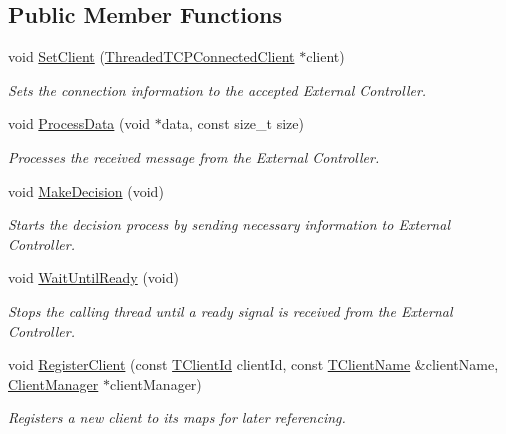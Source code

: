 \subsection*{Public Member Functions}
\begin{DoxyCompactItemize}
\item 
void \hyperlink{class_control_manager_a67d548535b36a78e315a0aa5f9f8e6c8}{Set\-Client} (\hyperlink{class_threaded_t_c_p_connected_client}{Threaded\-T\-C\-P\-Connected\-Client} $\ast$client)
\begin{DoxyCompactList}\small\item\em Sets the connection information to the accepted External Controller. \end{DoxyCompactList}\item 
void \hyperlink{class_control_manager_a2dc55da1b01fd175b3d885c68b8a7524}{Process\-Data} (void $\ast$data, const size\-\_\-t size)
\begin{DoxyCompactList}\small\item\em Processes the received message from the External Controller. \end{DoxyCompactList}\item 
void \hyperlink{class_control_manager_a0d5212df17307aef87d42add3aa6cc7a}{Make\-Decision} (void)
\begin{DoxyCompactList}\small\item\em Starts the decision process by sending necessary information to External Controller. \end{DoxyCompactList}\item 
void \hyperlink{class_control_manager_a4e23ffb481554c26cf99c411dd16ae36}{Wait\-Until\-Ready} (void)
\begin{DoxyCompactList}\small\item\em Stops the calling thread until a ready signal is received from the External Controller. \end{DoxyCompactList}\item 
void \hyperlink{class_control_manager_a56df538a5380c9091123a5a8a5e0fe86}{Register\-Client} (const \hyperlink{class_control_manager_a1bff13cab35db39c43f81f49b56e4849}{T\-Client\-Id} client\-Id, const \hyperlink{class_control_manager_ae9c86c5286c9ebf222ea44b60c463872}{T\-Client\-Name} \&client\-Name, \hyperlink{class_client_manager}{Client\-Manager} $\ast$client\-Manager)
\begin{DoxyCompactList}\small\item\em Registers a new client to its maps for later referencing. \end{DoxyCompactList}\item 

\end{DoxyCompactItemize}
